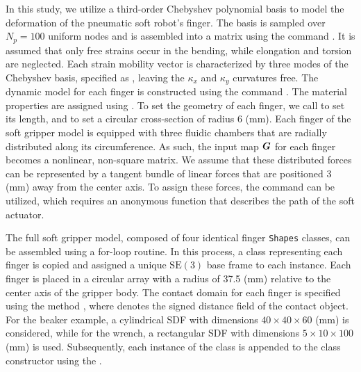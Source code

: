 In this study, we utilize a third-order Chebyshev polynomial basis to model the deformation of the pneumatic soft robot's finger. The basis is sampled over $N_p = 100$ uniform nodes and is assembled into a matrix using the command . It is assumed that only free strains occur in the bending, while elongation and torsion are neglected. Each strain mobility vector is characterized by three modes of the Chebyshev basis, specified as , leaving the $\kappa_x$ and $\kappa_y$ curvatures free. The dynamic model for each finger is constructed using the command . The material properties are assigned using . To set the geometry of each finger, we call  to set its length, and  to set a circular cross-section of radius $6$ (mm). Each finger of the soft gripper model is equipped with three fluidic chambers that are radially distributed along its circumference. As such, the input map ${\boldsymbol{G}}$ for each finger becomes a nonlinear, non-square matrix. We assume that these distributed forces can be represented by a tangent bundle of linear forces that are positioned $3$ (mm) away from the center axis. To assign these forces, the  command can be utilized, which requires an anonymous function  that describes the path of the soft actuator. %





The full soft gripper model, composed of four identical finger \texttt{Shapes} classes, can be assembled using a for-loop routine. In this process, a class representing each finger is copied and assigned a unique $\textrm{SE}(3)$ base frame to each instance. Each finger is placed in a circular array with a radius of 37.5 (mm) relative to the center axis of the gripper body. The contact domain for each finger is specified using the method , where  denotes the signed distance field of the contact object. For the beaker example, a cylindrical SDF with dimensions $40 \times 40 \times 60$ (mm) is considered, while for the wrench, a rectangular SDF with dimensions $5 \times 10 \times 100$ (mm) is used. Subsequently, each instance of the  class is appended to the  class constructor using the .

